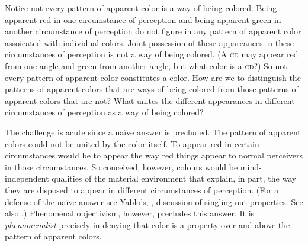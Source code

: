 \documentclass[12pt]{article}
\begin{document}
Notice not every pattern of apparent color is a way of being colored. Being apparent red in one circumstance of perception and being apparent green in another circumstance of perception do not figure in any pattern of apparent color assoicated with individual colors. Joint possession of these appareances in these circumstances of perception is not a way of being colored. (A \textsc{cd} may appear red from one angle and green from another angle, but what color is a \textsc{cd}?) So not every pattern of apparent color constitutes a color. How are we to distinguish the patterns of apparent colors that are ways of being colored from those patterns of apparent colors that are not? What unites the different appearances in different circumstances of perception as a way of being colored?

The challenge is acute since a naïve answer is precluded. The pattern of apparent colors could not be united by the color itself. To appear red in certain circumstances would be to appear the way red things appear to normal perceivers in those circumstances. So conceived, however, colours would be mind-in\-de\-pen\-dent qualities of the material environment that explain, in part, the way they are disposed to appear in different circumstances of perception. (For a defense of the na\"{i}ve answer see Yablo's, \citeyear{Yablo:1995fk}, discussion of singling out properties. See also \citealp{Campbell:1997dq}.) Phenomenal objectivism, however, precludes this answer. It is \emph{phenomenalist} precisely in denying that color is a property over and above the pattern of apparent colors. 
\end{document}

